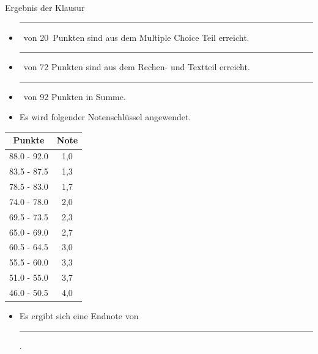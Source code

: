 \documentclass[a4paper, 9pt]{scrartcl}\usepackage[]{graphicx}\usepackage[]{xcolor}
\begin{document}
\begin{graybox}{Ergebnis der Klausur}
  \vspace{1Ex}
  \begin{itemize}
  \item[] \rule[0ex]{3em}{.4pt}\, von 20\, Punkten sind aus dem Multiple
    Choice Teil erreicht.
  \item[] \rule[0ex]{3em}{.4pt}\, von 72 Punkten sind aus dem Rechen- und
    Textteil erreicht. 
  \item[] \rule[0ex]{3em}{.4pt}\, von 92 Punkten in Summe.
  \item[] Es wird folgender Notenschl{\"u}ssel angewendet.   
  \end{itemize}
  \vspace{1ex}
\begin{center}
  \begin{tabular}[c]{cc}
    \toprule
    \textbf{Punkte}	&	\textbf{Note}	\\
    \midrule
    88.0 - 92.0	&	1,0	\\
    83.5 - 87.5	&	1,3	\\
    78.5 - 83.0	&	1,7	\\
    74.0 - 78.0	&	2,0	\\
    69.5 - 73.5	&	2,3	\\
    65.0 - 69.0	&	2,7	\\
    60.5 - 64.5	&	3,0	\\
    55.5 - 60.0	&	3,3	\\
    51.0 - 55.0	&	3,7	\\
    46.0 - 50.5	&	4,0	\\
    \bottomrule
  \end{tabular}
\end{center}
  \vspace{1ex}
\begin{itemize}
\item[] Es ergibt sich eine Endnote von \rule[0ex]{4em}{.4pt}.
\end{itemize}
  \vspace{1Ex}
\end{graybox}

\newpage
\end{document}
